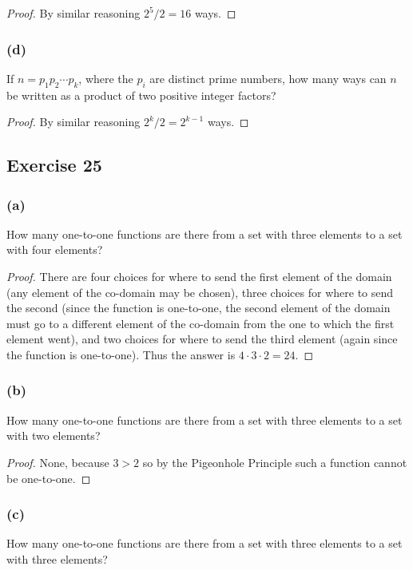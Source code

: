 \documentclass[14pt]{extarticle}
\begin{document}
\begin{proof}
     By similar reasoning \(2^5 / 2 = 16\) ways.
\end{proof}

\subsubsection{(d)}
If \(n = p_1p_2 \cdots p_k\), where the \(p_i\) are distinct prime numbers, how many ways can \(n\) be written
as a product of two positive integer factors?

\begin{proof}
     By similar reasoning \(2^k / 2 = 2^{k-1}\) ways.
\end{proof}

\subsection{Exercise 25}
\subsubsection{(a)}
How many one-to-one functions are there from a set with three elements to a set with four elements?

\begin{proof}
     There are four choices for where to send the first element of the domain (any element of the co-domain may be chosen), three
     choices for where to send the second (since the function is one-to-one, the second element of the domain must go to a
     different element of the co-domain from the one to which the first element went), and two choices for where to send the
     third element (again since the function is one-to-one). Thus the answer is \(4 \cdot 3 \cdot 2 = 24\).
\end{proof}

\subsubsection{(b)}
How many one-to-one functions are there from a set with three elements to a set with two elements?

\begin{proof}
     None, because \(3 > 2\) so by the Pigeonhole Principle such a function cannot be one-to-one.
\end{proof}

\subsubsection{(c)}
How many one-to-one functions are there from a set with three elements to a set with three elements?
\end{document}

